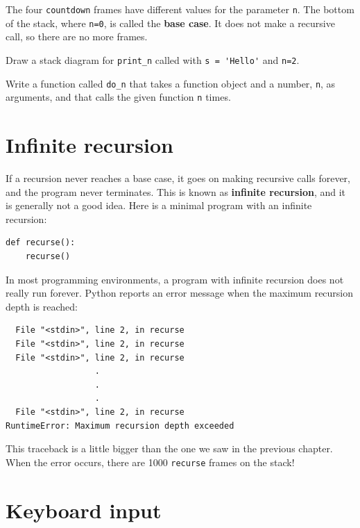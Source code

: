 \documentclass[10pt]{book}
\begin{document}
The four {\tt countdown} frames have different values for the
parameter {\tt n}.  The bottom of the stack, where {\tt n=0}, is
called the {\bf base case}.  It does not make a recursive call, so
there are no more frames.

\begin{exercise}
Draw a stack diagram for \verb"print_n" called with
\verb"s = 'Hello'" and {\tt n=2}.
\end{exercise}

\begin{exercise}
Write a function called \verb"do_n" that takes a function
object and a number, {\tt n}, as arguments, and that calls
the given function {\tt n} times.
\end{exercise}



\section{Infinite recursion}

If a recursion never reaches a base case, it goes on making
recursive calls forever, and the program never terminates.  This is
known as {\bf infinite recursion}, and it is generally not
a good idea.  Here is a minimal program with an infinite recursion:

\begin{verbatim}
def recurse():
    recurse()
\end{verbatim}
%
In most programming environments, a program with infinite recursion
does not really run forever.  Python reports an error
message when the maximum recursion depth is reached:

\begin{verbatim}
  File "<stdin>", line 2, in recurse
  File "<stdin>", line 2, in recurse
  File "<stdin>", line 2, in recurse
                  .   
                  .
                  .
  File "<stdin>", line 2, in recurse
RuntimeError: Maximum recursion depth exceeded
\end{verbatim}
%
This traceback is a little bigger than the one we saw in the
previous chapter.  When the error occurs, there are 1000
{\tt recurse} frames on the stack!


\section{Keyboard input}
\end{document}
